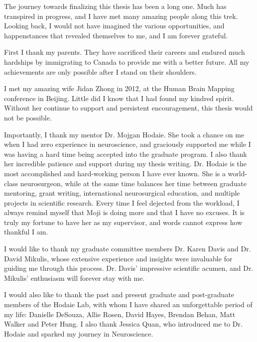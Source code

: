 \newpage
\begin{acknowledgements}

{\parskip=12pt
The journey towards finalizing this thesis has been a long one. Much has transpired in progress, and I have met many amazing people along this trek. Looking back, I would not have imagined the various opportunities, and happenstances that revealed themselves to me, and I am forever grateful. 

First I thank my parents. They have sacrificed their careers and endured much hardships by immigrating to Canada to provide me with a better future. All my achievements are only possible after I stand on their shoulders. 

I met my amazing wife Jidan Zhong in 2012, at the Human Brain Mapping conference in Beijing. Little did I know that I had found my kindred spirit. Without her continue to support and persistent encouragement, this thesis would not be possible. 

Importantly, I thank my mentor Dr. Mojgan Hodaie. She took a chance on me when I had zero experience in neuroscience, and graciously supported me while I was having a hard time being accepted into the graduate program. I also thank her incredible patience and support during my thesis writing. Dr. Hodaie is the most accomplished and hard-working person I have ever known. She is a world-class neurosurgeon, while at the same time balances her time between graduate mentoring, grant writing, international neurosurgical education, and multiple projects in scientific research. Every time I feel dejected from the workload, I always remind myself that Moji is doing more and that I have no excuses. It is truly my fortune to have her as my supervisor, and words cannot express how thankful I am. 

I would like to thank my graduate committee members Dr. Karen Davis and Dr. David Mikulis, whose extensive experience and insights were invaluable for guiding me through this process. Dr. Davis' impressive scientific acumen, and Dr. Mikulis' enthusiasm will forever stay with me. 

I would also like to thank the past and present graduate and post-graduate members of the Hodaie Lab, with whom I have shared an unforgettable period of my life: Danielle DeSouza, Allie Rosen, David Hayes, Brendan Behan, Matt Walker and Peter Hung. I also thank Jessica Quan, who introduced me to Dr. Hodaie and sparked my journey in Neuroscience. 

}
\end{acknowledgements}
